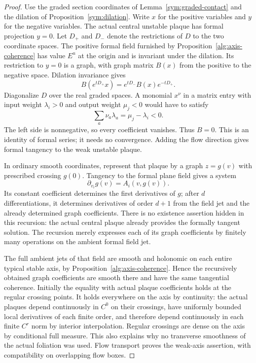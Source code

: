 \begin{proof}
Use the graded section coordinates of Lemma~\ref{sym:graded-contact}
and the dilation of Proposition~\ref{sym:dilation}.  Write $x$ for the positive variables and $y$ for
the negative variables.  The actual central unstable plaque has formal
projection $y=0$.  Let $D_+$ and $D_-$ denote the restrictions of $D$ to the
two coordinate spaces.  The positive formal field furnished by
Proposition~\ref{alg:axis-coherence} has value $E^u$ at the origin and is invariant
under the dilation.  Its restriction to $y=0$ is a graph, with graph matrix
$B(x)$ from the positive to the negative space.  Dilation invariance gives
\[
 B(e^{tD_+}x)=e^{tD_-}B(x)e^{-tD_+}.
\]
Diagonalize $D$ over the real graded spaces.  A monomial $x^\nu$ in a matrix
entry with input weight $\lambda_i>0$ and output weight $\mu_j<0$ would
have to satisfy
\[
 \sum_a\nu_a\lambda_a=\mu_j-\lambda_i<0.
\]
The left side is nonnegative, so every coefficient vanishes.  Thus $B=0$.
This is an identity of formal series; it needs no convergence.  Adding the
flow direction gives formal tangency to the weak unstable plaque.

In ordinary smooth coordinates, represent that plaque by a graph $z=g(v)$
with prescribed crossing $g(0)$.  Tangency to the formal plane field gives a
system
\[
 \partial_{v_i}g(v)=A_i(v,g(v)).
\]
Its constant coefficient determines the first derivatives of $g$; after
$d$ differentiations, it determines derivatives of order $d+1$ from the
field jet and the already determined graph coefficients.  There is no
existence assertion hidden in this recursion: the actual central plaque
already provides the formally tangent solution.  The recursion merely
expresses each of its graph coefficients by finitely many operations on
the ambient formal field jet.

The full ambient jets of that field are smooth and holonomic on each
entire typical stable axis, by Proposition~\ref{alg:axis-coherence}.  Hence the
recursively obtained graph coefficients are smooth there and have the
same tangential coherence.  Initially the equality with actual plaque
coefficients holds at the regular crossing points.  It holds everywhere
on the axis by continuity: the actual plaques depend continuously in
$C^0$ on their crossings, have uniformly bounded local derivatives of
each finite order, and therefore depend continuously in each finite
$C^r$ norm by interior interpolation.  Regular crossings are dense on the
axis by conditional full measure.  This also explains why no transverse
smoothness of the actual foliation was used.  Flow transport proves the
weak-axis assertion, with compatibility on overlapping flow boxes.
\end{proof}

